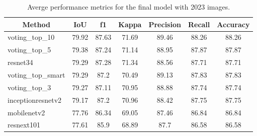 \begin{table}[H]
    \centering
    \caption[Average performance metrics of the final model]{Averge performance
        metrics for the final model with 2023 images.}
    \label{tab:avg_performance_2023}
    \begin{tabular}{lcccccc}
        \toprule
        \multicolumn{1}{c}{\textbf{Method}} & \textbf{IoU}       &
        \textbf{f1}                         &
        \textbf{Kappa}                      & \textbf{Precision} &
        \textbf{Recall}                     & \textbf{Accuracy}
        \\ \midrule
        voting\_top\_10                     & 79.92              & 87.63
                                            & 71.69              & 89.46 &
        88.26                               & 88.26
        \\
        voting\_top\_5                      & 79.38              & 87.24
                                            & 71.14              & 88.95 &
        87.87                               & 87.87
        \\
        resnet34                            & 79.29              & 87.28
                                            & 71.34              & 88.56 &
        87.71                               & 87.71
        \\
        voting\_top\_smart                  & 79.29              & 87.2
                                            & 70.49              & 89.13 &
        87.83                               & 87.83
        \\
        voting\_top\_3                      & 79.27              & 87.11
                                            & 70.95              & 88.88 &
        87.74                               & 87.74
        \\
        inceptionresnetv2                   & 79.17              & 87.2
                                            & 70.96              & 88.42 &
        87.75                               & 87.75
        \\
        mobilenetv2                         & 77.76              & 86.34
                                            & 69.05              & 87.46 &
        86.84                               & 86.84
        \\
        resnext101                          & 77.61              & 85.9
                                            & 68.89              & 87.7  &
        86.58                               & 86.58
        \\

\end{tabular}
\end{table}
